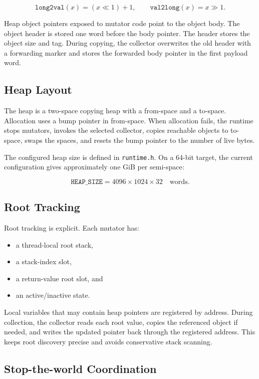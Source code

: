 \documentclass[11pt]{article}
\begin{document}
\[
  \texttt{long2val}(x) = (x \ll 1) + 1, \qquad
  \texttt{val2long}(x) = x \gg 1.
\]

Heap object pointers exposed to mutator code point to the object body. The
object header is stored one word before the body pointer. The header stores the
object size and tag. During copying, the collector overwrites the old header
with a forwarding marker and stores the forwarded body pointer in the first
payload word.

\subsection{Heap Layout}

The heap is a two-space copying heap with a from-space and a to-space. Allocation
uses a bump pointer in from-space. When allocation fails, the runtime stops
mutators, invokes the selected collector, copies reachable objects to to-space,
swaps the spaces, and resets the bump pointer to the number of live bytes.

The configured heap size is defined in \texttt{runtime.h}. On a 64-bit target,
the current configuration gives approximately one GiB per semi-space:

\[
  \texttt{HEAP\_SIZE} = 4096 \times 1024 \times 32 \quad \text{words}.
\]

\subsection{Root Tracking}

Root tracking is explicit. Each mutator has:

\begin{itemize}
  \item a thread-local root stack,
  \item a stack-index slot,
  \item a return-value root slot, and
  \item an active/inactive state.
\end{itemize}

Local variables that may contain heap pointers are registered by address. During
collection, the collector reads each root value, copies the referenced object if
needed, and writes the updated pointer back through the registered address. This
keeps root discovery precise and avoids conservative stack scanning.

\subsection{Stop-the-world Coordination}
\end{document}
